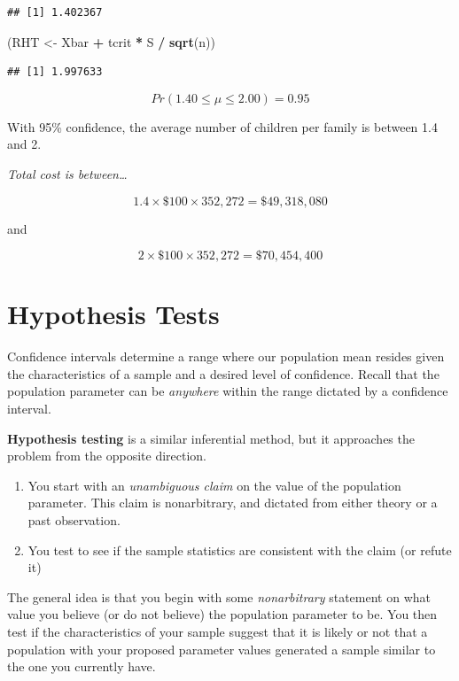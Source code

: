 \documentclass[
]{book}
\newenvironment{Shaded}{\begin{snugshade}}{\end{snugshade}}
\newcommand{\FunctionTok}[1]{\textcolor[rgb]{0.13,0.29,0.53}{\textbf{#1}}}
\newcommand{\NormalTok}[1]{#1}
\newcommand{\OtherTok}[1]{\textcolor[rgb]{0.56,0.35,0.01}{#1}}
\newcommand{\SpecialCharTok}[1]{\textcolor[rgb]{0.81,0.36,0.00}{\textbf{#1}}}
\begin{document}
\begin{verbatim}
## [1] 1.402367
\end{verbatim}

\begin{Shaded}
\begin{Highlighting}[]
\NormalTok{(RHT }\OtherTok{\textless{}{-}}\NormalTok{ Xbar }\SpecialCharTok{+}\NormalTok{ tcrit }\SpecialCharTok{*}\NormalTok{ S }\SpecialCharTok{/} \FunctionTok{sqrt}\NormalTok{(n))}
\end{Highlighting}
\end{Shaded}

\begin{verbatim}
## [1] 1.997633
\end{verbatim}

\[Pr(1.40 \leq \mu \leq 2.00) = 0.95\]

With 95\% confidence, the average number of children per family is between 1.4 and 2.

\emph{Total cost is between\ldots{}}

\[1.4 \times \$100 \times 352,272 = \$49,318,080\]

and

\[2 \times \$100 \times 352,272 = \$70,454,400\]

\chapter{Hypothesis Tests}\label{HT}

Confidence intervals determine a range where our population mean resides given the characteristics of a sample and a desired level of confidence. Recall that the population parameter can be \emph{anywhere} within the range dictated by a confidence interval.

\textbf{Hypothesis testing} is a similar inferential method, but it approaches the problem from the opposite direction.

\begin{enumerate}
\def\labelenumi{\arabic{enumi}.}
\item
  You start with an \emph{unambiguous claim} on the value of the population parameter. This claim is nonarbitrary, and dictated from either theory or a past observation.
\item
  You test to see if the sample statistics are consistent with the claim (or refute it)
\end{enumerate}

The general idea is that you begin with some \emph{nonarbitrary} statement on what value you believe (or do not believe) the population parameter to be. You then test if the characteristics of your sample suggest that it is likely or not that a population with your proposed parameter values generated a sample similar to the one you currently have.
\end{document}
